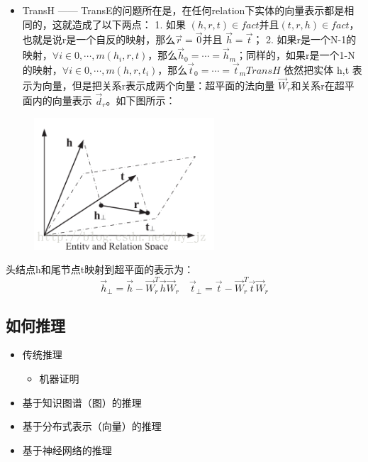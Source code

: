 \begin{frame}
	\begin{itemize}
		\item TransH —— TransE的问题所在是，在任何relation下实体的向量表示都是相同的，这就造成了以下两点： 1. 如果 $(h,r,t) \in fact$并且$(t,r,h) \in fact$，也就是说r是一个自反的映射，那么$\vec{r} = \vec{0} $并且 $\vec{h} = \vec{t}$； 2. 如果r是一个N-1的映射，$\forall i \in {0, \cdots , m} (h_i , r,t)$，那么$\vec{h}_0= \cdots = \vec{h}_m$；同样的，如果r是一个1-N的映射，$\forall i \in {0, \cdots , m} (h , r,t_i)$，那么$\vec{t}_0= \cdots = \vec{t}_m TransH$ 依然把实体 h,t 表示为向量，但是把关系r表示成两个向量：超平面的法向量 $\vec{W}_r$和关系r在超平面内的向量表示 $\vec{d}_r$。如下图所示：	
	\end{itemize}
\end{frame}
\begin{frame}
\begin{figure}[htbp]
	\centering
	\includegraphics[width=0.6\textwidth, bb= 0 0 277 202]{pic/kg/transH.png}
\end{figure}
头结点h和尾节点t映射到超平面的表示为： 
\begin{equation}
\vec{h}_{\perp} = \vec{h} - \vec{W}_r^T \vec{h} \vec{W}_r \quad  \vec{t}_{\perp} = \vec{t} - \vec{W}_r^T \vec{t} \vec{W}_r 
\end{equation}
\end{frame}

\subsection*{如何推理}

\begin{frame}
	\begin{itemize}
		\item 传统推理
			\begin{itemize}
				\item 机器证明
			\end{itemize}
		\item 基于知识图谱（图）的推理
		\item 基于分布式表示（向量）的推理
		\item 基于神经网络的推理
	\end{itemize}
\end{frame}

